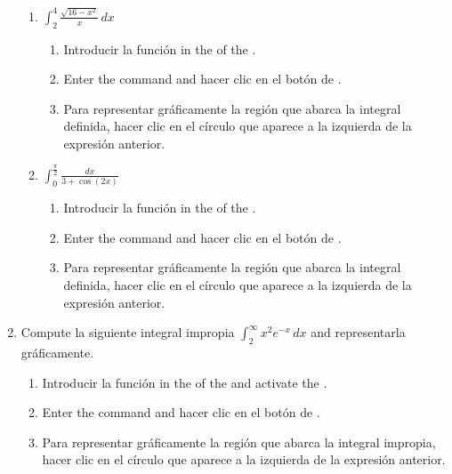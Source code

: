 \begin{enumerate}[leftmargin=*]
\begin{enumerate}
      \item $\displaystyle \int_2^4 \frac{\sqrt{16-x^{2}}}{x}\,dx$
            \begin{indication}
            \begin{enumerate}
            \item Introducir la función  in the  of the  .
            \item Enter the command  and hacer clic en el botón de .
            \item Para representar gráficamente la región que abarca la integral definida, hacer clic en el círculo que aparece a la izquierda de la expresión anterior.
            \end{enumerate}
            \end{indication}

      \item $\displaystyle \int_0^{\frac{\pi}{2}} \frac{dx}{3+\cos(2x)}$
            \begin{indication}
            \begin{enumerate}
            \item Introducir la función  in the  of the  .
            \item Enter the command  and hacer clic en el botón de .
            \item Para representar gráficamente la región que abarca la integral definida, hacer clic en el círculo que aparece a la izquierda de la expresión anterior.
            \end{enumerate}
            \end{indication}
      \end{enumerate}

\item Compute la siguiente integral impropia $\int_2^{\infty} x^2e^{-x}\,dx$ and representarla gráficamente.
      \begin{indication}
      \begin{enumerate}
      \item Introducir la función  in the  of the   and activate the .
      \item Enter the command  and hacer clic en el botón de .
      \item Para representar gráficamente la región que abarca la integral impropia, hacer clic en el círculo que aparece a la izquierda de la expresión anterior.
      \end{enumerate}
      \end{indication}



\end{enumerate}

